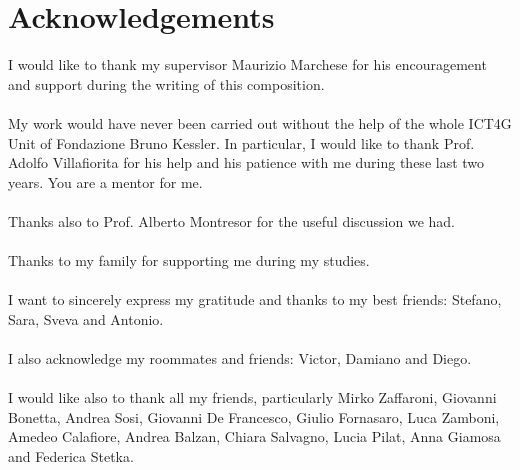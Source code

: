 \chapter*{Acknowledgements}
\thispagestyle{empty}

I would like to thank my supervisor Maurizio Marchese for his encouragement and support during the writing of this composition.
\\ \\
My work would have never been carried out without the help of the whole ICT4G Unit of Fondazione Bruno Kessler. In particular, I would like to thank Prof. Adolfo Villafiorita for his help and his patience with me during these last two years. You are a mentor for me. 
\\ \\
Thanks also to Prof. Alberto Montresor for the useful discussion we had.
\\ \\
Thanks to my family for supporting me during my studies. 
\\ \\
I want to sincerely express my gratitude and thanks to my best friends: Stefano, Sara, Sveva and Antonio.
\\ \\
I also acknowledge my roommates and friends: Victor, Damiano and Diego.
\\ \\
I would like also to thank all my friends, particularly Mirko Zaffaroni, Giovanni Bonetta, Andrea Sosi, Giovanni De Francesco, Giulio Fornasaro, Luca Zamboni, Amedeo Calafiore, Andrea Balzan, Chiara Salvagno, Lucia Pilat, Anna Giamosa and Federica Stetka.